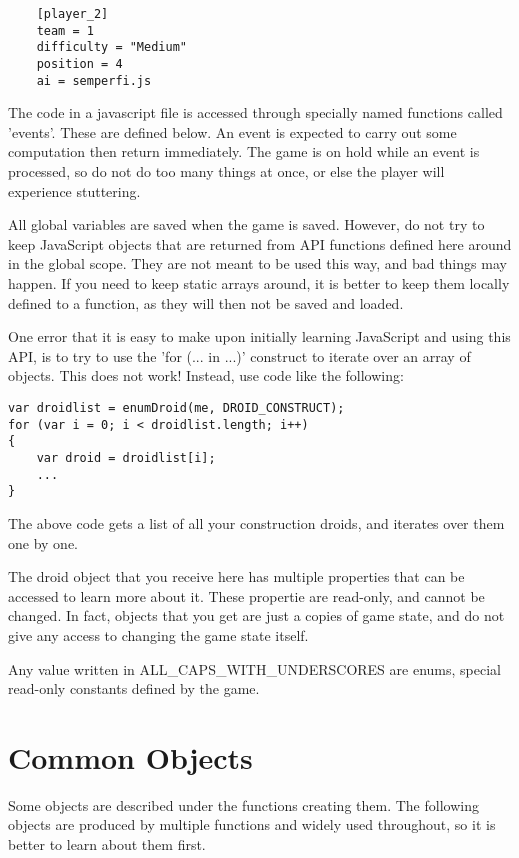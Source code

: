 \documentclass[12pt]{article}
\begin{document}
\begin{verbatim}
	[player_2]
	team = 1
	difficulty = "Medium"
	position = 4
	ai = semperfi.js
\end{verbatim}

The code in a javascript file is accessed through specially named functions called 'events'. These are defined below. 
An event is expected to carry out some computation then return immediately. The game is on hold while an event is 
processed, so do not do too many things at once, or else the player will experience stuttering.

All global variables are saved when the game is saved. However, do not try to keep JavaScript objects that are
returned from API functions defined here around in the global scope. They are not meant to be used this way, and
bad things may happen. If you need to keep static arrays around, it is better to keep them locally defined to a
function, as they will then not be saved and loaded.

One error that it is easy to make upon initially learning JavaScript and using this API, is to try to use
the 'for (... in ...)' construct to iterate over an array of objects. This does not work! Instead, use code
like the following:

\begin{lstlisting}
var droidlist = enumDroid(me, DROID_CONSTRUCT);
for (var i = 0; i < droidlist.length; i++)
{
	var droid = droidlist[i];
	...
}
\end{lstlisting}

The above code gets a list of all your construction droids, and iterates over them one by one.

The droid object that you receive here has multiple properties that can be accessed to learn more about it. 
These propertie are read-only, and cannot be changed. In fact, objects that you get are just a copies of 
game state, and do not give any access to changing the game state itself.

Any value written in ALL_CAPS_WITH_UNDERSCORES are enums, special read-only constants defined by the
game.

\section{Common Objects}

Some objects are described under the functions creating them. The following objects are produced by
multiple functions and widely used throughout, so it is better to learn about them first.
\end{document}
